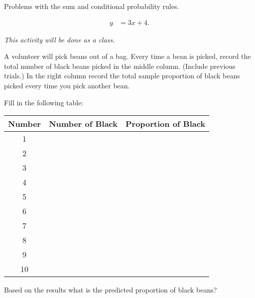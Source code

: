 

\begin{problem}
\item Problems with the sum and conditional probability rules.

  \begin{subproblem}
  \item 
    \begin{eqnarray}
      y & = 3x + 4.
    \end{eqnarray}
    \vfill
  \end{subproblem}


\end{problem}




\begin{problem}

\item \textit{This activity will be done as a class.}

  A volunteer will pick beans out of a bag. Every time a bean is
  picked, record the total number of black beans picked in the middle
  column. (Include previous trials.) In the right column record the
  total sample proportion of black beans picked every time you pick
  another bean.

\item Fill in the following table:

  \begin{tabular}{| c | c | r |}
    \hline 
    Number & Number of Black & Proportion of Black \\  \hline 
    1 &  & \\  [12pt] \hline 
    2 & & \\  [12pt] \hline 
    3 & & \\  [12pt] \hline 
    4 & & \\  [12pt]  \hline 
    5 & & \\  [12pt] \hline 
    6 & & \\  [12pt] \hline 
    7 & & \\  [12pt] \hline 
    8 & & \\  [12pt] \hline 
    9 & & \\  [12pt] \hline 
    10 & & \\  [12pt] \hline 
  \end{tabular}

\item Based on the results what is the predicted proportion of black beans? 


\end{problem}

